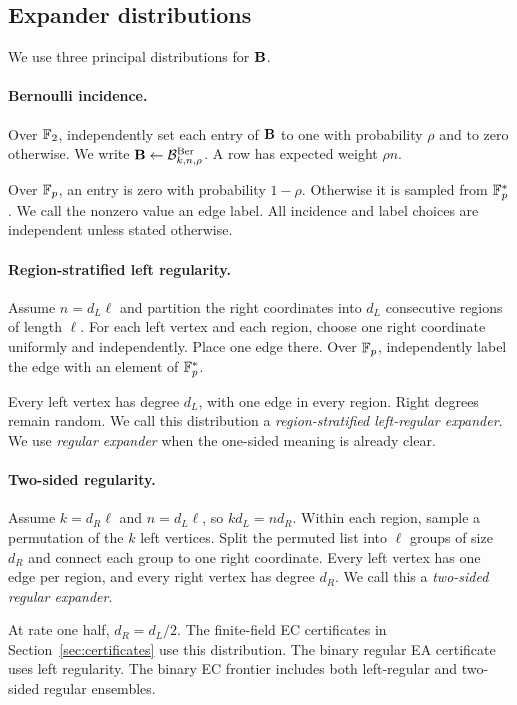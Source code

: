 \subsection{Expander distributions}

We use three principal distributions for $\mathbf B$.

\paragraph{Bernoulli incidence.}
Over $\mathbb F_2$, independently set each entry of $\mathbf B$ to one with probability
$\rho$ and to zero otherwise.  We write
$\mathbf B\gets\mathcal B^{\mathrm{Ber}}_{k,n,\rho}$.  A row has expected weight
$\rho n$.

Over $\mathbb F_p$, an entry is zero with probability $1-\rho$.  Otherwise it is
sampled from $\mathbb F_p^*$.  We call the nonzero value an edge label.  All
incidence and label choices are independent unless stated otherwise.

\paragraph{Region-stratified left regularity.}
Assume $n=d_L\ell$ and partition the right coordinates into $d_L$ consecutive
regions of length $\ell$.  For each left vertex and each region, choose one
right coordinate uniformly and independently.  Place one edge there.  Over
$\mathbb F_p$, independently label the edge with an element of $\mathbb F_p^*$.

Every left vertex has degree $d_L$, with one edge in every region.  Right
degrees remain random.  We call this distribution a
\emph{region-stratified left-regular expander}.  We use
\emph{regular expander} when the one-sided meaning is already clear.

\paragraph{Two-sided regularity.}
Assume $k=d_R\ell$ and $n=d_L\ell$, so $kd_L=nd_R$.  Within each region,
sample a permutation of the $k$ left vertices.  Split the permuted list into
$\ell$ groups of size $d_R$ and connect each group to one right coordinate.
Every left vertex has one edge per region, and every right vertex has degree
$d_R$.  We call this a \emph{two-sided regular expander}.

At rate one half, $d_R=d_L/2$.  The finite-field EC certificates in
Section~\ref{sec:certificates} use this distribution.  The binary regular
EA certificate uses left regularity.  The binary EC frontier includes both
left-regular and two-sided regular ensembles.

